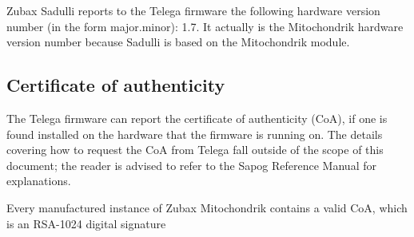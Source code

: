 \documentclass{zubaxdoc}
\begin{document}
Zubax Sadulli reports to the Telega firmware the following hardware version number
(in the form major.minor): 1.7. It actually is the Mitochondrik hardware version number because Sadulli is based on the Mitochondrik module. 

\subsection{Certificate of authenticity}\label{sec:certificate_of_authenticity}

The Telega firmware can report the certificate of authenticity (CoA),
if one is found installed on the hardware that the firmware is running on.
The details covering how to request the CoA from Telega fall outside of the scope of this document;
the reader is advised to refer to the Sapog Reference Manual for explanations.

Every manufactured instance of Zubax Mitochondrik contains a valid CoA, which is an RSA-1024 digital signature
\end{document}
